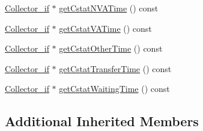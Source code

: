 \begin{DoxyCompactItemize}
\item 
\hyperlink{class_collector__if}{Collector\-\_\-if} $\ast$ \hyperlink{class_entity_type_acf55bd71e2f6bb30ea6a01a98afe7422}{get\-Cstat\-N\-V\-A\-Time} () const 
\item 
\hyperlink{class_collector__if}{Collector\-\_\-if} $\ast$ \hyperlink{class_entity_type_a846625383404c36329af057f674d825c}{get\-Cstat\-V\-A\-Time} () const 
\item 
\hyperlink{class_collector__if}{Collector\-\_\-if} $\ast$ \hyperlink{class_entity_type_abe5f66a11ccc80a4138b1f44c1e8a9fe}{get\-Cstat\-Other\-Time} () const 
\item 
\hyperlink{class_collector__if}{Collector\-\_\-if} $\ast$ \hyperlink{class_entity_type_acc36d61158eb2f6ab72caca114023bc2}{get\-Cstat\-Transfer\-Time} () const 
\item 
\hyperlink{class_collector__if}{Collector\-\_\-if} $\ast$ \hyperlink{class_entity_type_ac2682128310221efaaa81b3007ef8d50}{get\-Cstat\-Waiting\-Time} () const 
\end{DoxyCompactItemize}
\subsection*{Additional Inherited Members}


